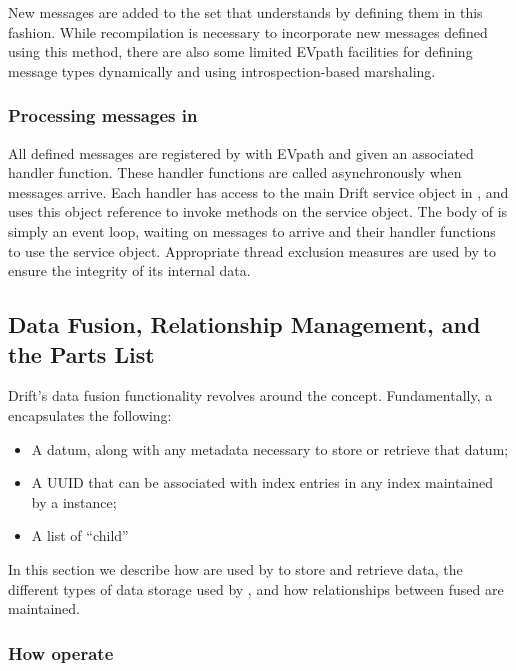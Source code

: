 New messages are added to the set that \driftd understands by defining them in this fashion.  While
recompilation is necessary to incorporate new messages defined using this method, there are also some
limited EVpath facilities for defining message types dynamically and using introspection-based
marshaling.  


\subsubsection{Processing messages in \driftd}

All defined messages are registered by \driftd with EVpath and given an associated handler function.
These handler functions are called asynchronously when messages arrive.  Each handler has access to the
main Drift service object in \driftd, and uses this object reference to invoke methods on the service
object.  The body of \driftd is simply an event loop, waiting on messages to arrive and their handler
functions to use the service object.  Appropriate thread exclusion measures are used by \driftd to ensure
the integrity of its internal data.

\newcommand{\partclass}{\texttt{drift::part}}

\subsection{Data Fusion, Relationship Management, and the Parts List}


Drift's data fusion functionality revolves around the \dpart concept.  Fundamentally, a
\dpart encapsulates the following:
\begin{itemize}
\item A datum, along with any metadata necessary to store or retrieve that datum;
\item A UUID that can be associated with index entries in any index maintained by a \driftd instance;
\item A list of ``child'' \dparts
\end{itemize}
In this section we describe how \dparts are used by \driftd to store and retrieve data, the different
types of data storage used by \driftd, and how relationships between fused \dparts are maintained.

\subsubsection{How \dparts operate}

